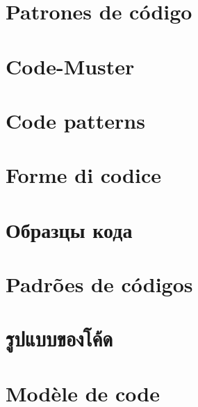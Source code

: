 \ifdefined\SPANISH
\chapter{Patrones de código}
\fi %

\ifdefined\GERMAN
\chapter{Code-Muster}
\fi %

\ifdefined\ENGLISH
\chapter{Code patterns}
\fi %

\ifdefined\ITALIAN
\chapter{Forme di codice}
\fi %

\ifdefined\RUSSIAN
\chapter{Образцы кода}
\fi %

\ifdefined\BRAZILIAN
\chapter{Padrões de códigos}
\fi %

\ifdefined\THAI
\chapter{รูปแบบของโค้ด}
\fi %

\ifdefined\FRENCH
\chapter{Modèle de code}
\fi %

\ifdefined\POLISH
\chapter{\PLph{}}
\fi %

\EN{}
\ES{}
\ITA{}
\PTBR{}
\RU{}
\THA{}
\DE{}
\FR{}
\PL{}

